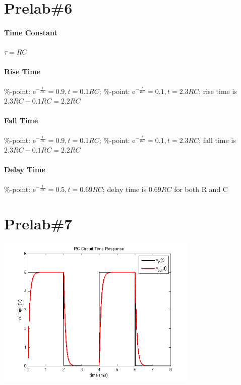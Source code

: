 \documentclass{IEEEtran}
\begin{document}
	\section{Prelab\#6}
		\paragraph{Time Constant} $\tau = RC$ 
		\paragraph{Rise Time} \hfill{}\%-point: $\mathrm{e}^{-\frac{t}{RC}} = 0.9, t = 0.1RC$; \%-point: $\mathrm{e}^{-\frac{t}{RC}} = 0.1, t = 2.3RC$; \newline
		rise time is $2.3RC - 0.1RC = 2.2RC$
		\paragraph{Fall Time} \hfill{}\%-point: $\mathrm{e}^{-\frac{t}{RC}} = 0.9, t = 0.1RC$; \%-point: $\mathrm{e}^{-\frac{t}{RC}} = 0.1, t = 2.3RC$; \newline
		fall time is $2.3RC - 0.1RC = 2.2RC$
		\paragraph{Delay Time} \hfill{}\%-point: $\mathrm{e}^{-\frac{t}{RC}} = 0.5, t = 0.69RC$; \newline
		delay time is $0.69RC$ for both R and C
	\section{Prelab\#7}
		\includegraphics[width=3.8in]{images/Prelab7.png}
\end{document}
